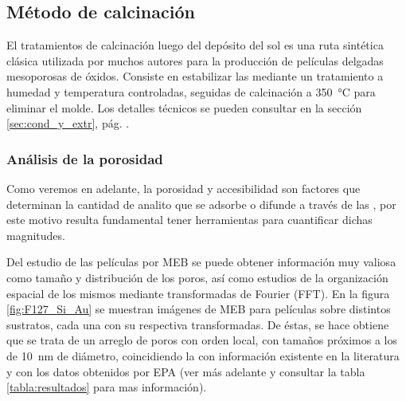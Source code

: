	 \subsection{Método de calcinación}
	 	
	 		El tratamientos de calcinación luego del depósito del sol es una ruta sintética clásica utilizada por muchos autores para la producción de películas delgadas mesoporosas de óxidos\cite{Soler-Illia2002a,Brinker1999,Soler-Illia2006,Grosso2004,Innocenzi2013,angelome2011}. Consiste en estabilizar las \pdm\space mediante un tratamiento a humedad y temperatura controladas, seguidas de calcinación a \SI{350}{\celsius} para eliminar el molde. Los detalles técnicos se pueden consultar en la sección \ref{sec:cond_y_extr}, pág. \pageref{sec:cond_y_extr}.

	 	  \subsubsection{Análisis de la porosidad}

		 Como veremos en adelante, la porosidad y accesibilidad son factores que determinan la cantidad de analito que se adsorbe o difunde a través de las \pdm, por este motivo resulta fundamental tener herramientas para cuantificar dichas magnitudes. 

		 Del estudio de las películas por MEB se puede obtener información muy valiosa como tamaño y distribución de los poros, así como estudios de la organización espacial de los mismos mediante transformadas de Fourier (FFT). En la figura \ref{fig:F127_Si_Au} se muestran imágenes de MEB para películas \pdmF sobre distintos sustratos, cada una con su respectiva transformadas. De éstas, se hace obtiene que se trata de un arreglo de poros con orden local, con tamaños próximos a los de \SI{10}{\nm} de diámetro, coincidiendo la con información existente en la literatura\cite{urade2005,angelome2011,lee2006} y con los datos obtenidos por EPA (ver más adelante y consultar la tabla \ref{tabla:resultados} para mas información).  

